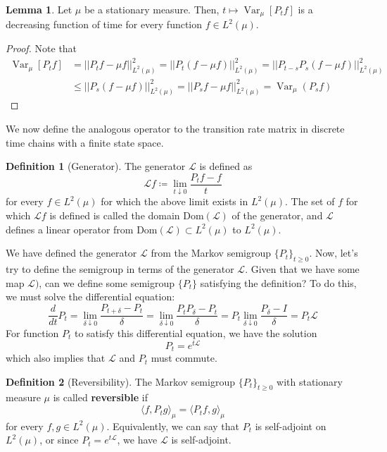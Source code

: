 \documentclass{article}
\DeclareMathOperator{\Var}{Var}
\theoremstyle{definition}
\newtheorem{lemma}[theorem]{Lemma}
\theoremstyle{remark}
\theoremstyle{definition}
\newtheorem{definition}{Definition}[section]
\begin{document}
  \begin{lemma}
  Let $\mu$ be a stationary measure. Then, $t \mapsto \Var_\mu [P_t f]$ is a decreasing function of time for every function $f \in L^2 (\mu)$. 
  \end{lemma}
  \begin{proof}
  Note that 
  \begin{align*}
      \Var_\mu [P_t f] & = ||P_t f - \mu f||^2_{L^2(\mu) } =  ||P_t (f - \mu f)||^2_{L^2 (\mu)} = ||P_{t - s} P_s (f - \mu f)||^2_{L^2 (\mu)} \\
      & \leq ||P_s (f - \mu f)||^2_{L^2 (\mu)} = ||P_s f - \mu f||^2_{L^2 (\mu)} = \Var_\mu (P_s f)
  \end{align*}
  \end{proof}

  We now define the analogous operator to the transition rate matrix in discrete time chains with a finite state space. 

  \begin{definition}[Generator]
  The generator $\mathscr{L}$ is defined as 
  \[\mathscr{L} f \coloneqq \lim_{t \downarrow 0} \frac{P_t f - f}{t}\]
  for every $f \in L^2 (\mu)$ for which the above limit exists in $L^2 (\mu)$. The set of $f$ for which $\mathscr{L}f$ is defined is called the domain $\mathrm{Dom}(\mathscr{L})$ of the generator, and $\mathscr{L}$ defines a linear operator from $\mathrm{Dom}(\mathscr{L}) \subset L^2 (\mu)$ to $L^2 (\mu)$. 
  \end{definition}

  We have defined the generator $\mathscr{L}$ from the Markov semigroup $\{P_t\}_{t \geq 0}$. Now, let's try to define the semigroup in terms of the generator $\mathscr{L}$. Given that we have some map $\mathscr{L})$, can we define some semigroup $\{P_t\}$ satisfying the definition? To do this, we must solve the differential equation: 
  \[\frac{d}{dt} P_t = \lim_{\delta \downarrow 0} \frac{P_{t + \delta} - P_t}{\delta} = \lim_{\delta \downarrow 0} \frac{P_t P_\delta - P_t}{\delta} = P_t \lim_{\delta \downarrow 0} \frac{P_\delta - I}{\delta} = P_t \mathscr{L}\]
  For function $P_t$ to satisfy this differential equation, we have the solution 
  \[P_t = e^{t \mathscr{L}}\]
  which also implies that $\mathscr{L}$ and $P_t$ must commute. 

  \begin{definition}[Reversibility]
  The Markov semigroup $\{P_t\}_{t \geq 0}$ with stationary measure $\mu$ is called \textbf{reversible} if 
  \[\langle f, P_t g \rangle_\mu = \langle P_t f, g \rangle_\mu\]
  for every $f, g \in L^2 (\mu)$. Equivalently, we can say that $P_t$ is self-adjoint on $L^2 (\mu)$, or since $P_t = e^{t \mathscr{L}}$, we have $\mathscr{L}$ is self-adjoint. 
  \end{definition}
\end{document}
